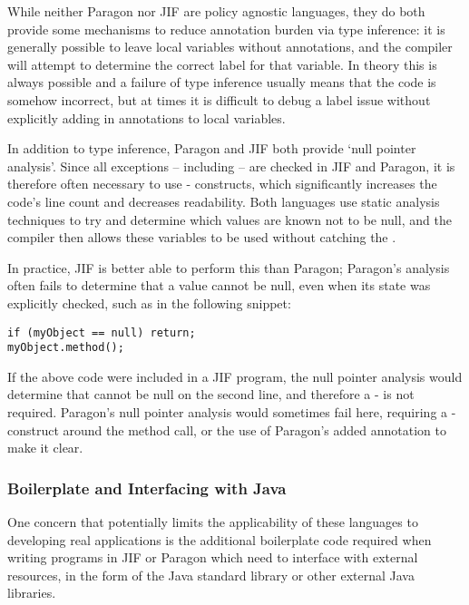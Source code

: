 While neither Paragon nor JIF are policy agnostic languages, they do both provide some mechanisms to reduce annotation burden via type inference: it is generally possible to leave local variables without annotations, and the compiler will attempt to determine the correct label for that variable. In theory this is always possible and a failure of type inference usually means that the code is somehow incorrect, but at times it is difficult to debug a label issue without explicitly adding in annotations to local variables.

In addition to type inference, Paragon and JIF both provide `null pointer analysis'. Since all exceptions -- including  -- are checked in JIF and Paragon, it is therefore often necessary to use - constructs, which significantly increases the code's line count and decreases readability. Both languages use static analysis techniques to try and determine which values are known not to be null, and the compiler then allows these variables to be used without catching the .

In practice, JIF is better able to perform this than Paragon; Paragon's analysis often fails to determine that a value cannot be null, even when its state was explicitly checked, such as in the following snippet:

\begin{verbatim}
if (myObject == null) return;
myObject.method();
\end{verbatim}

If the above code were included in a JIF program, the null pointer analysis would determine that  cannot be null on the second line, and therefore a - is not required. Paragon's null pointer analysis would sometimes fail here, requiring a - construct around the method call, or the use of Paragon's added  annotation to make it clear.

\subsubsection{Boilerplate and Interfacing with Java}

One concern that potentially limits the applicability of these languages to developing real applications is the additional boilerplate code required when writing programs in JIF or Paragon which need to interface with external resources, in the form of the Java standard library or other external Java libraries.

